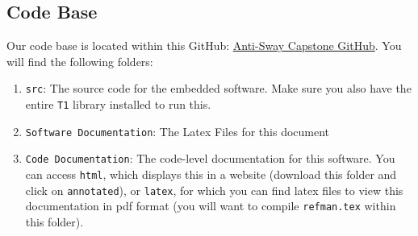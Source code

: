 \documentclass[letterpaper]{article}
\begin{document}
\subsection{Code Base}
Our code base is located within this GitHub: \hyperlink{https://github.com/me8927/Capstone-Stuff}{Anti-Sway Capstone GitHub}. You will find the following folders:
\begin{enumerate}
    \item \texttt{src}: The source code for the embedded software. Make sure you also have the entire \texttt{T1} library installed to run this.
    \item \texttt{Software Documentation}: The Latex Files for this document
    \item \texttt{Code Documentation}: The code-level documentation for this software. You can access \texttt{html}, which displays this in a website (download this folder and click on \texttt{annotated}), or \texttt{latex}, for which you can find latex files to view this documentation in pdf format (you will want to compile \texttt{refman.tex} within this folder).
\end{enumerate}
\end{document}
